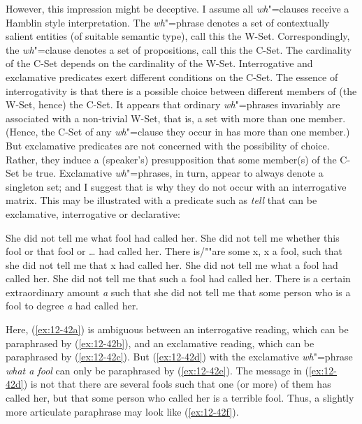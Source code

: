 \documentclass[output=paper]{langsci/langscibook}
\begin{document}
However, this impression might be deceptive. I assume all \emph{wh}"=clauses receive a Hamblin style interpretation. The \emph{wh}"=phrase denotes a set of contextually salient entities (of suitable semantic type), call this the W-Set.  Correspondingly, the
\emph{wh}"=clause denotes a set of propositions, call this the C-Set.
The cardinality of the C-Set depends on the cardinality of the W-Set.
Interrogative and exclamative predicates exert different conditions on
the C-Set. The essence of interrogativity is that there is a possible
choice between different members of (the W-Set, hence) the C-Set. It
appears that ordinary \emph{wh}"=phrases invariably are associated with
a non-trivial W-Set, that is, a set with more than one member. (Hence,
the C-Set of any \emph{wh}"=clause they occur in has more than one
member.) But exclamative predicates are not concerned with the
possibility of choice. Rather, they induce a (speaker's)
presupposition that some member(s) of the C-Set be true. Exclamative
\emph{wh}"=phrases, in turn, appear to always denote a singleton set;
and I suggest that is why they do not occur with an interrogative
matrix. This may be illustrated with a predicate such as  \textit{tell} that can
be exclamative, interrogative or declarative:
\begin{exe}
\ex
\label{ex:12-42}
\begin{xlist}   
\ex
\label{ex:12-42a}
She did not tell me what fool had called her.
\ex
\label{ex:12-42b}
She did not tell me whether this fool or that fool or  \ldots{}  had called her.
\ex
\label{ex:12-42c}
There is/""are some x, x a fool, such that she did not tell me that x had called her.
\ex
\label{ex:12-42d}
She did not tell me what a fool had called her.
\ex
\label{ex:12-42e}
She did not tell me that such a fool had called her.
\ex
\label{ex:12-42f}
There is a certain extraordinary amount \textit{a} such that she did
not tell me that some person who is a fool to degree \textit{a} had called her.
\end{xlist}  
\end{exe}
Here, (\ref{ex:12-42a}) is ambiguous between an interrogative reading, which can be
paraphrased by (\ref{ex:12-42b}), and an exclamative reading, which can be paraphrased by
(\ref{ex:12-42c}). But (\ref{ex:12-42d}) with the exclamative \emph{wh}"=phrase \textit{what a fool} can only be
paraphrased by (\ref{ex:12-42e}). The message in (\ref{ex:12-42d}) is not that there are several
fools such that one (or more) of them has called her, but that some person who
called her is a terrible fool. Thus, a slightly more articulate paraphrase may
look like (\ref{ex:12-42f}).
\end{document}
